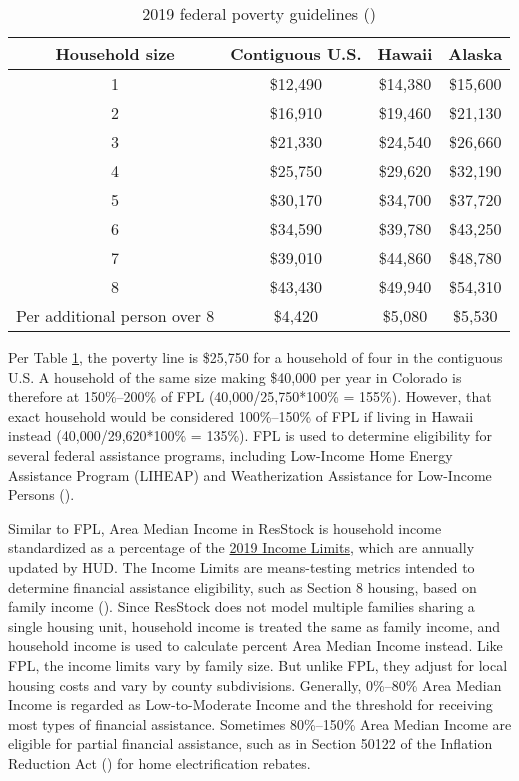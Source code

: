 \begin{table}
    \caption{2019 federal poverty guidelines (\cite{aspe_2019_fpl})}
    \label{tab:fpl}
    \centering
    \begin{tabular}{|c|c|c|c|}
    \hline
        Household size & Contiguous U.S. & Hawaii & Alaska \\
        \hline
        1 & \$12,490 & \$14,380 & \$15,600 \\
        2 & \$16,910 & \$19,460 & \$21,130 \\
        3 & \$21,330 & \$24,540 & \$26,660 \\
        4 & \$25,750 & \$29,620 & \$32,190 \\
        5 & \$30,170 & \$34,700 & \$37,720 \\
        6 & \$34,590 & \$39,780 & \$43,250 \\
        7 & \$39,010 & \$44,860 & \$48,780 \\
        8 & \$43,430 & \$49,940 & \$54,310 \\
        \hline
        Per additional person over 8 & \$4,420 & \$5,080 & \$5,530 \\
        \hline
    \end{tabular}
\end{table}

Per Table \ref{tab:fpl}, the poverty line is \$25,750 for a household of four in the contiguous U.S. A household of the same size making \$40,000 per year in Colorado is therefore at 150\%--200\% of FPL (40,000/25,750*100\% = 155\%). However, that exact household would be considered 100\%--150\% of FPL if living in Hawaii instead (40,000/29,620*100\% = 135\%). FPL is used to determine eligibility for several federal assistance programs, including Low-Income Home Energy Assistance Program (LIHEAP) and Weatherization Assistance for Low-Income Persons (\cite{aspe_fpl_use}).

Similar to FPL, Area Median Income in ResStock is household income standardized as a percentage of the \href{https://www.huduser.gov/portal/datasets/il.html#data_2019}{2019 Income Limits}, which are annually updated by HUD. The Income Limits are means-testing metrics intended to determine financial assistance eligibility, such as Section 8 housing, based on family income (\cite{hud2019_inc_lim_method}). Since ResStock does not model multiple families sharing a single housing unit, household income is treated the same as family income, and household income is used to calculate percent Area Median Income instead. Like FPL, the income limits vary by family size. But unlike FPL, they adjust for local housing costs and vary by county subdivisions. Generally, 0\%--80\% Area Median Income is regarded as Low-to-Moderate Income and the threshold for receiving most types of financial assistance. Sometimes 80\%--150\% Area Median Income are eligible for partial financial assistance, such as in Section 50122 of the Inflation Reduction Act (\cite{2022IRA}) for home electrification rebates.

